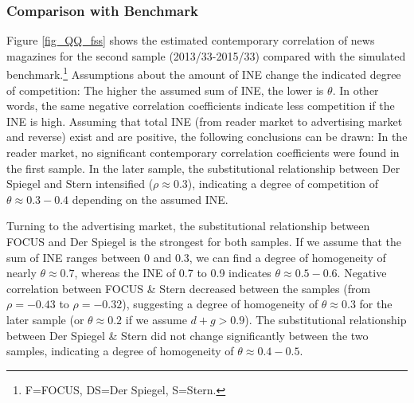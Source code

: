 \documentclass[12pt,a4paper,notitlepage]{article}
\begin{document}
\subsubsection{Comparison with Benchmark}

Figure \ref{fig_QQ_fss} shows the estimated contemporary correlation of news magazines for the second sample (2013/33-2015/33) compared with the simulated benchmark.\footnote{F=FOCUS, DS=Der Spiegel, S=Stern.} Assumptions about the amount of INE change the indicated degree of competition: The higher the assumed sum of INE, the lower is $\theta$. In other words, the same negative correlation coefficients indicate less competition if the INE is high. Assuming that total INE (from reader market to advertising market and reverse) exist and are positive, the following conclusions can be drawn: In the reader market, no significant contemporary correlation coefficients were found in the first sample. In the later sample, the substitutional relationship between Der Spiegel and Stern intensified ($\rho\approx0.3$), indicating a degree of competition of $\theta\approx0.3-0.4$ depending on the assumed INE.

Turning to the advertising market, the substitutional relationship between FOCUS and Der Spiegel is the strongest for both samples. If we assume that the sum of INE ranges between 0 and 0.3, we can find a degree of homogeneity of nearly $\theta\approx0.7$, whereas the INE of 0.7 to 0.9 indicates $\theta\approx0.5-0.6$. Negative correlation between FOCUS \& Stern decreased between the samples (from $\rho=-0.43$ to $\rho=-0.32$), suggesting a degree of homogeneity of $\theta\approx0.3$ for the later sample (or $\theta\approx0.2$ if we assume $d+g>0.9$). The substitutional relationship between Der Spiegel \& Stern did not change significantly between the two samples, indicating a degree of homogeneity of $\theta\approx0.4-0.5$.
\end{document}
